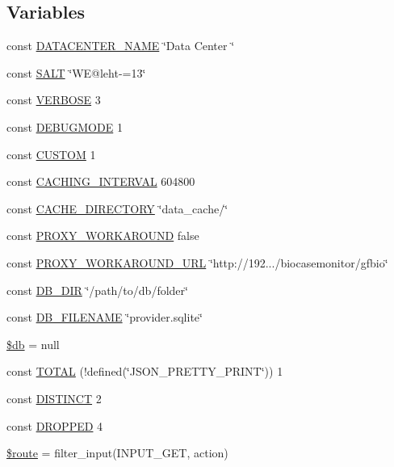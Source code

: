 \subsection*{Variables}
\begin{DoxyCompactItemize}
\item 
const \hyperlink{namespace_bms_a28e24c389e469e22acd9d33abfe3fb4d}{D\+A\+T\+A\+C\+E\+N\+T\+E\+R\+\_\+\+N\+A\+ME} \char`\"{}Data Center \char`\"{}
\item 
const \hyperlink{namespace_bms_a6d448b74f10f8080293b329a47a046b4}{S\+A\+LT} \char`\"{}WE@leht-\/=13\char`\"{}
\item 
const \hyperlink{namespace_bms_af070310b6692d4e96af677af14648411}{V\+E\+R\+B\+O\+SE} 3
\item 
const \hyperlink{namespace_bms_a7af7ef3e15183adae80bfc7cf0272937}{D\+E\+B\+U\+G\+M\+O\+DE} 1
\item 
const \hyperlink{namespace_bms_a4b14ca0fbcdfa3f37da752304008a9c1}{C\+U\+S\+T\+OM} 1
\item 
const \hyperlink{namespace_bms_ac3ff4673172a882fa4a11351118e2716}{C\+A\+C\+H\+I\+N\+G\+\_\+\+I\+N\+T\+E\+R\+V\+AL} 604800
\item 
const \hyperlink{namespace_bms_a43e84be6597c73c02e67db0dc944cd1a}{C\+A\+C\+H\+E\+\_\+\+D\+I\+R\+E\+C\+T\+O\+RY} \char`\"{}data\+\_\+cache/\char`\"{}
\item 
const \hyperlink{namespace_bms_a83815bb64763ef7810008cfe96d0ecf7}{P\+R\+O\+X\+Y\+\_\+\+W\+O\+R\+K\+A\+R\+O\+U\+ND} false
\item 
const \hyperlink{namespace_bms_a796fca3489760c39de0d4efdd11c67de}{P\+R\+O\+X\+Y\+\_\+\+W\+O\+R\+K\+A\+R\+O\+U\+N\+D\+\_\+\+U\+RL} \char`\"{}http\+://192.../biocasemonitor/gfbio\char`\"{}
\item 
const \hyperlink{namespace_bms_a525a6614ba9af7ba1f60bb7e60572a0c}{D\+B\+\_\+\+D\+IR} \char`\"{}/path/to/db/folder\char`\"{}
\item 
const \hyperlink{namespace_bms_abc05b2c0a077204fb0ef0f345a8f006f}{D\+B\+\_\+\+F\+I\+L\+E\+N\+A\+ME} \char`\"{}provider.\+sqlite\char`\"{}
\item 
\hyperlink{namespace_bms_a1fa3127fc82f96b1436d871ef02be319}{\$db} = null
\item 
const \hyperlink{namespace_bms_ad080a43f212802d39f67f19feeb26dfe}{T\+O\+T\+AL} (!defined(\char`\"{}J\+S\+O\+N\+\_\+\+P\+R\+E\+T\+T\+Y\+\_\+\+P\+R\+I\+NT\char`\"{})) 1
\item 
const \hyperlink{namespace_bms_a99cb80c249c1d51aa36375cca5921896}{D\+I\+S\+T\+I\+N\+CT} 2
\item 
const \hyperlink{namespace_bms_ac8aa145c99391c64083d1ab9451eedef}{D\+R\+O\+P\+P\+ED} 4
\item 
\hyperlink{namespace_bms_af4105acdee5d34dc96c2aec4058b81f9}{\$route} = filter\+\_\+input(I\+N\+P\+U\+T\+\_\+\+G\+ET, \textquotesingle{}action\textquotesingle{})
\end{DoxyCompactItemize}


